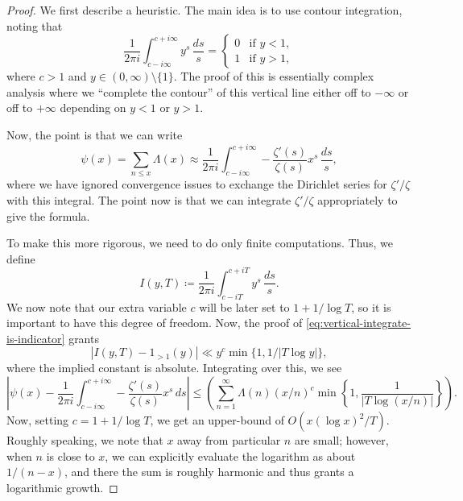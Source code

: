 \documentclass[../notes.tex]{subfiles}
\begin{document}
\begin{proof}
	We first describe a heuristic. The main idea is to use contour integration, noting that
	\begin{equation}
		\frac1{2\pi i}\int_{c-i\infty}^{c+i\infty}y^s\,\frac{ds}s=\begin{cases}
			0 & \text{if }y<1, \\
			1 & \text{if }y>1,
		\end{cases} \label{eq:vertical-integrate-is-indicator}
	\end{equation}
	where $c>1$ and $y\in(0,\infty)\setminus\{1\}$. The proof of this is essentially complex analysis where we ``complete the contour'' of this vertical line either off to $-\infty$ or off to $+\infty$ depending on $y<1$ or $y>1$.
	
	Now, the point is that we can write
	\[\psi(x)=\sum_{n\le x}\Lambda(x)\approx\frac1{2\pi i}\int_{c-i\infty}^{c+i\infty}-\frac{\zeta'(s)}{\zeta(s)}x^s\,\frac{ds}s,\]
	where we have ignored convergence issues to exchange the Dirichlet series for $\zeta'/\zeta$ with this integral. The point now is that we can integrate $\zeta'/\zeta$ appropriately to give the formula.
	
	To make this more rigorous, we need to do only finite computations. Thus, we define
	\[I(y,T)\coloneqq\frac1{2\pi i}\int_{c-iT}^{c+iT}y^s\,\frac{ds}s.\]
	We now note that our extra variable $c$ will be later set to $1+1/\log T$, so it is important to have this degree of freedom. Now, the proof of \eqref{eq:vertical-integrate-is-indicator} grants
	\[|I(y,T)-1_{>1}(y)|\ll y^c\min\{1,1/|T\log y|\},\]
	where the implied constant is absolute. Integrating over this, we see
	\[\left|\psi(x)-\frac1{2\pi i}\int_{c-i\infty}^{c+i\infty}-\frac{\zeta'(s)}{\zeta(s)}x^s\,ds\right|\le\left(\sum_{n=1}^\infty\Lambda(n)(x/n)^c\min\left\{1,\frac1{|T\log(x/n)|}\right\}\right).\]
	Now, setting $c=1+1/\log T$, we get an upper-bound of $O\left(x(\log x)^2/T\right)$. Roughly speaking, we note that $x$ away from particular $n$ are small; however, when $n$ is close to $x$, we can explicitly evaluate the logarithm as about $1/(n-x)$, and there the sum is roughly harmonic and thus grants a logarithmic growth.
\end{proof}
\end{document}
